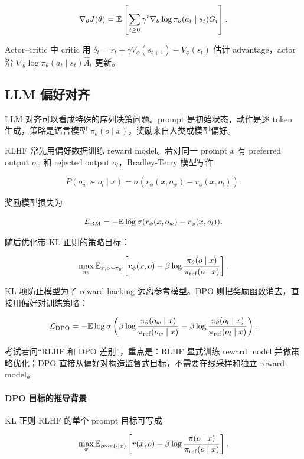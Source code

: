 \[
  \nabla_\theta J(\theta)=\mathbb{E}\left[\sum_{t\ge0}\gamma^t\nabla_\theta\log\pi_\theta(a_t\mid s_t)G_t\right].
\]

Actor--critic 中 critic 用 \(\delta_t=r_t+\gamma V_\phi(s_{t+1})-V_\phi(s_t)\) 估计 advantage，actor 沿 \(\nabla_\theta\log\pi_\theta(a_t\mid s_t)\widehat A_t\) 更新。

\subsection{LLM 偏好对齐}


LLM 对齐可以看成特殊的序列决策问题。prompt 是初始状态，动作是逐 token 生成，策略是语言模型 \(\pi_\theta(o\mid x)\)，奖励来自人类或模型偏好。

RLHF 常先用偏好数据训练 reward model。若对同一 prompt \(x\) 有 preferred output \(o_w\) 和 rejected output \(o_l\)，Bradley-Terry 模型写作

\[
  P(o_w\succ o_l\mid x)
  =
  \sigma(r_\phi(x,o_w)-r_\phi(x,o_l)).
\]

奖励模型损失为

\[
  \mathcal{L}_{\mathrm{RM}}
  =
  -
  \mathbb{E}
  \log
  \sigma(r_\phi(x,o_w)-r_\phi(x,o_l)).
\]

随后优化带 KL 正则的策略目标：

\[
  \max_{\pi_\theta}
  \mathbb{E}_{x,o\sim\pi_\theta}
  \left[
    r_\phi(x,o)
    -
    \beta
    \log
    \frac{\pi_\theta(o\mid x)}{\pi_{\mathrm{ref}}(o\mid x)}
  \right].
\]

KL 项防止模型为了 reward hacking 远离参考模型。DPO 则把奖励函数消去，直接用偏好对训练策略：

\[
  \mathcal{L}_{\mathrm{DPO}}
  =
  -
  \mathbb{E}
  \log
  \sigma
  \left(
    \beta
    \log
    \frac{\pi_\theta(o_w\mid x)}{\pi_{\mathrm{ref}}(o_w\mid x)}
    -
    \beta
    \log
    \frac{\pi_\theta(o_l\mid x)}{\pi_{\mathrm{ref}}(o_l\mid x)}
  \right).
\]

考试若问“RLHF 和 DPO 差别”，重点是：RLHF 显式训练 reward model 并做策略优化；DPO 直接从偏好对构造监督式目标，不需要在线采样和独立 reward model。

\paragraph{DPO 目标的推导背景}

KL 正则 RLHF 的单个 prompt 目标可写成

\[
  \max_{\pi}
  \mathbb{E}_{o\sim\pi(\cdot\mid x)}
  \left[
    r(x,o)
    -
    \beta
    \log
    \frac{\pi(o\mid x)}{\pi_{\mathrm{ref}}(o\mid x)}
  \right].
\]

